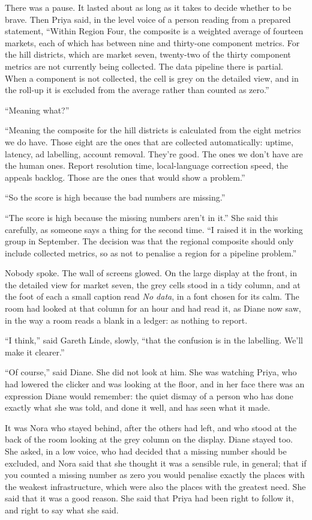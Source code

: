 There was a pause. It lasted about as long as it takes to decide whether to be brave. Then Priya said, in the level voice of a person reading from a prepared statement, ``Within Region Four, the composite is a weighted average of fourteen markets, each of which has between nine and thirty-one component metrics. For the hill districts, which are market seven, twenty-two of the thirty component metrics are not currently being collected. The data pipeline there is partial. When a component is not collected, the cell is grey on the detailed view, and in the roll-up it is excluded from the average rather than counted as zero.''

``Meaning what?''

``Meaning the composite for the hill districts is calculated from the eight metrics we do have. Those eight are the ones that are collected automatically: uptime, latency, ad labelling, account removal. They're good. The ones we don't have are the human ones. Report resolution time, local-language correction speed, the appeals backlog. Those are the ones that would show a problem.''

``So the score is high because the bad numbers are missing.''

``The score is high because the missing numbers aren't in it.'' She said this carefully, as someone says a thing for the second time. ``I raised it in the working group in September. The decision was that the regional composite should only include collected metrics, so as not to penalise a region for a pipeline problem.''

Nobody spoke. The wall of screens glowed. On the large display at the front, in the detailed view for market seven, the grey cells stood in a tidy column, and at the foot of each a small caption read \emph{No data}, in a font chosen for its calm. The room had looked at that column for an hour and had read it, as Diane now saw, in the way a room reads a blank in a ledger: as nothing to report.

``I think,'' said Gareth Linde, slowly, ``that the confusion is in the labelling. We'll make it clearer.''

``Of course,'' said Diane. She did not look at him. She was watching Priya, who had lowered the clicker and was looking at the floor, and in her face there was an expression Diane would remember: the quiet dismay of a person who has done exactly what she was told, and done it well, and has seen what it made.

It was Nora who stayed behind, after the others had left, and who stood at the back of the room looking at the grey column on the display. Diane stayed too. She asked, in a low voice, who had decided that a missing number should be excluded, and Nora said that she thought it was a sensible rule, in general; that if you counted a missing number as zero you would penalise exactly the places with the weakest infrastructure, which were also the places with the greatest need. She said that it was a good reason. She said that Priya had been right to follow it, and right to say what she said.


